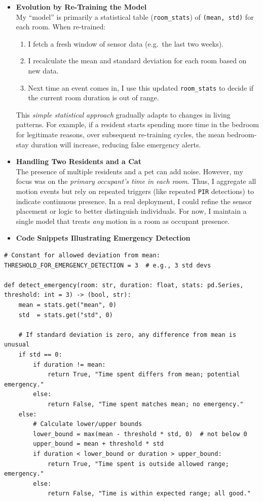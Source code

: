 \documentclass[A4,10pt]{article}
\begin{document}
\begin{itemize}
    \item \textbf{Evolution by Re-Training the Model} \\
    My ``model'' is primarily a statistical table (\texttt{room\_stats}) of \texttt{(mean, std)} for each room. When re-trained:
    \begin{enumerate}
      \item I fetch a fresh window of sensor data (e.g.\ the last two weeks).
      \item I recalculate the mean and standard deviation for each room based on new data.
      \item Next time an event comes in, I use this updated \texttt{room\_stats} to decide if the current room duration is out of range.
    \end{enumerate}
    This \emph{simple statistical approach} gradually adapts to changes in living patterns. For example, if a resident starts spending more time in the bedroom for legitimate reasons, over subsequent re-training cycles, the mean bedroom-stay duration will increase, reducing false emergency alerts.

    \item \textbf{Handling Two Residents and a Cat} \\
    The presence of multiple residents and a pet can add noise. However, my focus was on the \emph{primary occupant’s time in each room}. Thus, I aggregate all motion events but rely on repeated triggers (like repeated \texttt{PIR} detections) to indicate continuous presence. In a real deployment, I could refine the sensor placement or logic to better distinguish individuals. For now, I maintain a single model that treats \textit{any} motion in a room as occupant presence.

    \item \textbf{Code Snippets Illustrating Emergency Detection}
\end{itemize}

\begin{verbatim}
# Constant for allowed deviation from mean:
THRESHOLD_FOR_EMERGENCY_DETECTION = 3  # e.g., 3 std devs

def detect_emergency(room: str, duration: float, stats: pd.Series, threshold: int = 3) -> (bool, str):
    mean = stats.get("mean", 0)
    std  = stats.get("std", 0)

    # If standard deviation is zero, any difference from mean is unusual
    if std == 0:
        if duration != mean:
            return True, "Time spent differs from mean; potential emergency."
        else:
            return False, "Time spent matches mean; no emergency."
    else:
        # Calculate lower/upper bounds
        lower_bound = max(mean - threshold * std, 0)  # not below 0
        upper_bound = mean + threshold * std
        if duration < lower_bound or duration > upper_bound:
            return True, "Time spent is outside allowed range; emergency."
        else:
            return False, "Time is within expected range; all good."
\end{verbatim}
\end{document}
